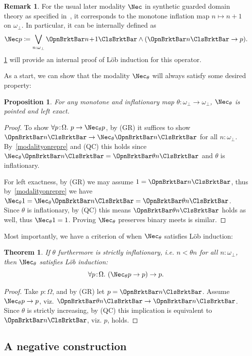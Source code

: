 \documentclass[a4paper,10pt]{amsart}
\newtheorem{theorem}{Theorem}[section]
\newtheorem{proposition}{Proposition}[section]
\theoremstyle{definition}
\newtheorem{remark}{Remark}[section]
\newcommand{\fa}[2]{\forall #1 \!:\! #2.\ }
\newcommand{\ass}[1]{\OpnBrktBar#1\ClsBrktBar}
\newcommand{\ovob}{\omega_\bot}
\newcommand{\bbx}{\Nec}
\newcommand{\Prop}{\Omega}
\newcommand{\plo}{\!+\!1}
\begin{document}
\begin{remark}\label{usualmodalitypos}
  For the usual later modality $\bbx$ in synthetic guarded domain theory as specified in~\cite{birkedal2012first}, it corresponds to the monotone inflation map $n \mapsto n\plo$ on $\ovob$. In particular, it can be internally defined as  
  \[ \bbx p \coloneq \bigvee_{n:\ovob}\ass{n\plo} \wedge (\ass n \to p). \]
  \cref{lobprop} will provide an internal proof of L\"ob induction for this operator.
\end{remark}

As a start, we can show that the modality $\bbx_\theta$ will always satisfy some desired property:

\begin{proposition}\label{posproplex}
  For any monotone and inflationary map $\theta \colon \ovob \to \ovob$, $\bbx_\theta$ is pointed and left exact.
\end{proposition}
\begin{proof}
  To show $\fa p{\Prop}p \to \bbx_\theta p$, by (GR) it suffices to show $\ass n \to \bbx_\theta\ass n$ for all $n:\ovob$. By~\cref{modalityonrepre} and (QC) this holds since $\bbx_\theta\ass n = \ass{\theta n}$ and $\theta$ is inflationary. 
  
  For left exactness, by (GR) we may assume $1 = \ass n$, thus by~\cref{modalityonrepre} we have $\bbx_\theta 1 = \bbx_\theta\ass n = \ass{\theta n}$. Since $\theta$ is inflationary, by (QC) this means $\ass{\theta n}$ holds as well, thus $\bbx_\theta 1 = 1$. Proving $\bbx_\theta$ preserves binary meets is similar.
\end{proof}

Most importantly, we have a criterion of when $\bbx_\theta$ satisfies L\"ob induction:

\begin{theorem}\label{lobprop}
  If $\theta$ furthermore is strictly inflationary, i.e. $n < \theta n$ for all $n:\ovob$, then $\bbx_\theta$ satisfies L\"ob induction:
  \[ \fa p{\Prop} (\bbx_\theta p \to p) \to p. \]
\end{theorem}
\begin{proof}
  Take $p:\Prop$, and by (GR) let $p = \ass n$. Assume $\bbx_\theta p \to p$, viz. $\ass{\theta n} \to \ass{n}$. Since $\theta$ is strictly increasing, by (QC) this implication is equivalent to $\ass n$, viz. $p$, holds.
\end{proof}

\subsection{A negative construction}
\end{document}
